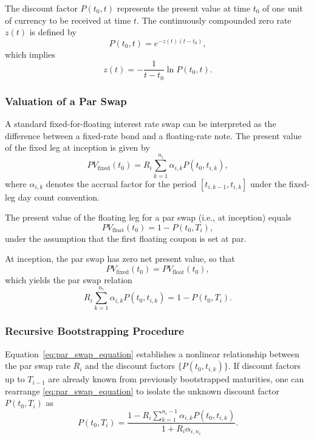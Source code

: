 The discount factor $P(t_0, t)$ represents the present value at time $t_0$ of one unit of currency to be received at time $t$. The continuously compounded zero rate $z(t)$ is defined by
\begin{equation}
	P(t_0, t) = e^{-z(t)(t - t_0)},
	\label{eq:discount_zero_relation}
\end{equation}
which implies
\begin{equation}
	z(t) = -\frac{1}{t - t_0} \ln P(t_0, t).
	\label{eq:zero_rate_definition}
\end{equation}

\subsubsection{Valuation of a Par Swap}
A standard fixed-for-floating interest rate swap can be interpreted as the difference between a fixed-rate bond and a floating-rate note. The present value of the fixed leg at inception is given by
\begin{equation}
	PV_{\text{fixed}}(t_0) = R_i \sum_{k=1}^{n_i} \alpha_{i,k} P(t_0, t_{i,k}),
	\label{eq:fixed_leg_pv}
\end{equation}
where $\alpha_{i,k}$ denotes the accrual factor for the period $[t_{i,k-1}, t_{i,k}]$ under the fixed-leg day count convention.

The present value of the floating leg for a par swap (i.e., at inception) equals
\begin{equation}
	PV_{\text{float}}(t_0) = 1 - P(t_0, T_i),
	\label{eq:float_leg_pv}
\end{equation}
under the assumption that the first floating coupon is set at par.

At inception, the par swap has zero net present value, so that
\begin{equation}
	PV_{\text{fixed}}(t_0) = PV_{\text{float}}(t_0),
	\label{eq:par_swap_condition}
\end{equation}
which yields the par swap relation
\begin{equation}
	R_i \sum_{k=1}^{n_i} \alpha_{i,k} P(t_0, t_{i,k}) = 1 - P(t_0, T_i).
	\label{eq:par_swap_equation}
\end{equation}

\subsubsection{Recursive Bootstrapping Procedure}
Equation~\eqref{eq:par_swap_equation} establishes a nonlinear relationship between the par swap rate $R_i$ and the discount factors $\{P(t_0, t_{i,k})\}$. If discount factors up to $T_{i-1}$ are already known from previously bootstrapped maturities, one can rearrange \eqref{eq:par_swap_equation} to isolate the unknown discount factor $P(t_0, T_i)$ as
\begin{equation}
	P(t_0, T_i) = \frac{1 - R_i \sum_{k=1}^{n_i - 1} \alpha_{i,k} P(t_0, t_{i,k})}
	{1 + R_i \alpha_{i,n_i}}.
	\label{eq:bootstrap_equation}
\end{equation}

